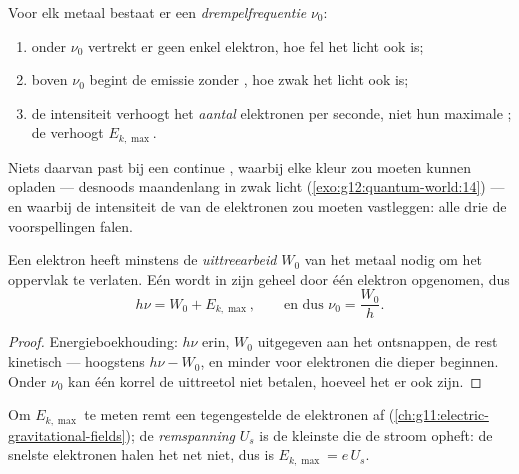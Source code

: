\begin{proposition}\label{prop:g12:quantum-world:facts}
Voor elk metaal bestaat er een
\emph{drempelfrequentie} $\nu_0$:
\begin{enumerate}
  \item onder $\nu_0$ vertrekt er geen enkel elektron, hoe fel het licht ook
        is;
  \item boven $\nu_0$ begint de emissie zonder , hoe zwak het licht
        ook is;
  \item de intensiteit verhoogt het \emph{aantal} elektronen per seconde, niet
        hun maximale ; de  verhoogt
        $E_{k,\max}$.
\end{enumerate}
Niets daarvan past bij een continue , waarbij elke kleur zou moeten
kunnen opladen --- desnoods maandenlang in zwak licht
(\cref{exo:g12:quantum-world:14}) --- en waarbij de intensiteit de  van
de elektronen zou moeten vastleggen: alle drie de voorspellingen falen.
\end{proposition}
\admitted

\begin{theorem}\label{thm:g12:quantum-world:einstein}
Een elektron heeft minstens de
\emph{uittreearbeid} $W_0$ van het metaal nodig om het
oppervlak te verlaten. Eén  wordt in zijn geheel door één elektron
opgenomen, dus
\[
h\nu = W_0 + E_{k,\max}, \qquad \text{en dus } \nu_0 = \frac{W_0}{h}.
\]
\end{theorem}

\begin{proof}
Energieboekhouding: $h\nu$ erin, $W_0$ uitgegeven aan het ontsnappen, de rest
kinetisch --- hoogstens $h\nu - W_0$, en minder voor elektronen die dieper
beginnen. Onder $\nu_0$ kan één korrel de uittreetol niet betalen, hoeveel het
er ook zijn.
\end{proof}

\begin{definition}[Remspanning]\label{def:g12:quantum-world:stopping}
Om $E_{k,\max}$ te meten remt een tegengestelde  de elektronen af
(\cref{ch:g11:electric-gravitational-fields}); de
\emph{remspanning} $U_s$ is de kleinste  die de
stroom opheft: de snelste elektronen halen het net niet, dus is
$E_{k,\max} = e\,U_s$.
\end{definition}

